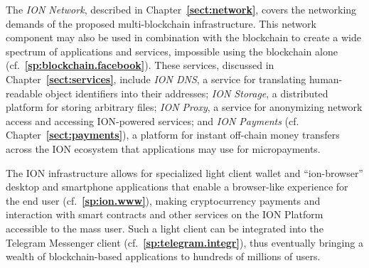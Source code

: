 \documentclass[12pt,oneside]{article}
\def\refpoint#1{{\rm\textbf{\ref{#1}}}}
\let\ptref=\refpoint
\def\markbothsame#1{\fancyhead[C]{#1}}
\begin{document}
The {\em ION Network}, described in Chapter~\ptref{sect:network},
covers the networking demands of the proposed multi-blockchain
infrastructure. This network component may also be used in combination
with the blockchain to create a wide spectrum of applications and
services, impossible using the blockchain alone
(cf.~\ptref{sp:blockchain.facebook}). These services, discussed in
Chapter~\ptref{sect:services}, include {\em ION DNS}, a service for
translating human-readable object identifiers into their addresses;
{\em ION Storage}, a distributed platform for storing arbitrary files;
{\em ION Proxy}, a service for anonymizing network access and
accessing ION-powered services; and {\em ION Payments\/}
(cf. Chapter~\ptref{sect:payments}), a platform for instant off-chain
money transfers across the ION ecosystem that applications may use for
micropayments.

The ION infrastructure allows for specialized light client wallet and
``ion-browser'' desktop and smartphone applications that enable a
browser-like experience for the end user (cf.~\ptref{sp:ion.www}),
making cryptocurrency payments and interaction with smart contracts
and other services on the ION Platform accessible to the mass
user. Such a light client can be integrated into the Telegram
Messenger client (cf.~\ptref{sp:telegram.integr}), thus eventually
bringing a wealth of blockchain-based applications to hundreds of
millions of users.

%
%
%
%

\clearpage
\markbothsame{\textsc{References}}
\end{document}
